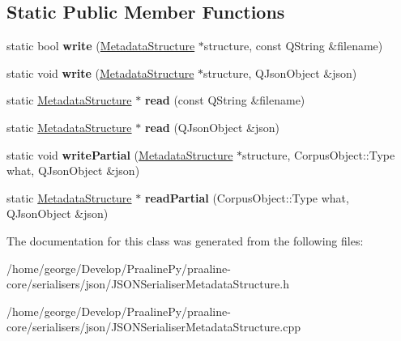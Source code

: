 \subsection*{Static Public Member Functions}
\begin{DoxyCompactItemize}
\item 
\mbox{\label{class_j_s_o_n_serialiser_metadata_structure_a34d73da805e5bdcd7d9b506e5106e86f}} 
static bool {\bfseries write} (\hyperlink{class_metadata_structure}{Metadata\+Structure} $\ast$structure, const Q\+String \&filename)
\item 
\mbox{\label{class_j_s_o_n_serialiser_metadata_structure_ab74e69d8f1a7cceb1f406a5e747310a8}} 
static void {\bfseries write} (\hyperlink{class_metadata_structure}{Metadata\+Structure} $\ast$structure, Q\+Json\+Object \&json)
\item 
\mbox{\label{class_j_s_o_n_serialiser_metadata_structure_a8dc1beb9201162e14b32c6a6a55a184a}} 
static \hyperlink{class_metadata_structure}{Metadata\+Structure} $\ast$ {\bfseries read} (const Q\+String \&filename)
\item 
\mbox{\label{class_j_s_o_n_serialiser_metadata_structure_a27a695d824dcbc79b0b8dc9fcd88228a}} 
static \hyperlink{class_metadata_structure}{Metadata\+Structure} $\ast$ {\bfseries read} (Q\+Json\+Object \&json)
\item 
\mbox{\label{class_j_s_o_n_serialiser_metadata_structure_aff0c5b5d61e83e3ffcf3054b12589fe1}} 
static void {\bfseries write\+Partial} (\hyperlink{class_metadata_structure}{Metadata\+Structure} $\ast$structure, Corpus\+Object\+::\+Type what, Q\+Json\+Object \&json)
\item 
\mbox{\label{class_j_s_o_n_serialiser_metadata_structure_a2a37b65d24e59b82ef19f417088922cd}} 
static \hyperlink{class_metadata_structure}{Metadata\+Structure} $\ast$ {\bfseries read\+Partial} (Corpus\+Object\+::\+Type what, Q\+Json\+Object \&json)
\end{DoxyCompactItemize}


The documentation for this class was generated from the following files\+:\begin{DoxyCompactItemize}
\item 
/home/george/\+Develop/\+Praaline\+Py/praaline-\/core/serialisers/json/J\+S\+O\+N\+Serialiser\+Metadata\+Structure.\+h\item 
/home/george/\+Develop/\+Praaline\+Py/praaline-\/core/serialisers/json/J\+S\+O\+N\+Serialiser\+Metadata\+Structure.\+cpp\end{DoxyCompactItemize}
